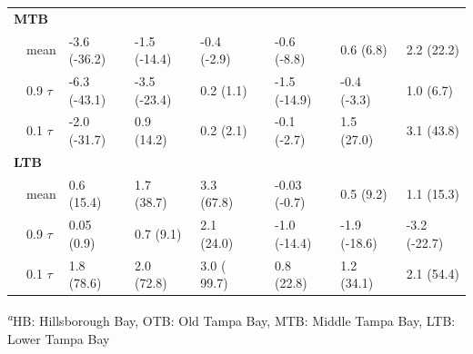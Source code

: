 \documentclass{svjour3}\usepackage[]{graphicx}\usepackage[]{color}
\begin{document}
\begin{table}[!tbp]
\begin{center}
\begin{tabular}{llllclll}
\hline
{\bfseries MTB}&&&&&&&\tabularnewline
~~mean&-3.6 {\footnotesize (-36.2)}&-1.5 {\footnotesize (-14.4)}&-0.4 {\footnotesize (-2.9)}&&-0.6 {\footnotesize (-8.8)}&0.6 {\footnotesize (6.8)}&2.2 {\footnotesize (22.2)}\tabularnewline
~~0.9 $\tau$&-6.3 {\footnotesize (-43.1)}&-3.5 {\footnotesize (-23.4)}&0.2 {\footnotesize (1.1)}&&-1.5 {\footnotesize (-14.9)}&-0.4 {\footnotesize (-3.3)}&1.0 {\footnotesize (6.7)}\tabularnewline
~~0.1 $\tau$&-2.0 {\footnotesize (-31.7)}&0.9 {\footnotesize (14.2)}&0.2 {\footnotesize (2.1)}&&-0.1 {\footnotesize (-2.7)}&1.5 {\footnotesize (27.0)}&3.1 {\footnotesize (43.8)}\tabularnewline
\hline
{\bfseries LTB}&&&&&&&\tabularnewline
~~mean&0.6 {\footnotesize (15.4)}&1.7 {\footnotesize (38.7)}&3.3 {\footnotesize (67.8)}&&-0.03 {\footnotesize (-0.7)}&0.5 {\footnotesize (9.2)}&1.1 {\footnotesize (15.3)}\tabularnewline
~~0.9 $\tau$&0.05 {\footnotesize (0.9)}&0.7 {\footnotesize (9.1)}&2.1 {\footnotesize (24.0)}&&-1.0 {\footnotesize (-14.4)}&-1.9 {\footnotesize (-18.6)}&-3.2 {\footnotesize (-22.7)}\tabularnewline
~~0.1 $\tau$&1.8 {\footnotesize (78.6)}&2.0 {\footnotesize (72.8)}&3.0 {\footnotesize ( 99.7)}&&0.8 {\footnotesize (22.8)}&1.2 {\footnotesize (34.1)}&2.1 {\footnotesize (54.4)}\tabularnewline
\hline
\end{tabular}\end{center}

\footnotesize \textsuperscript{\textit{a}}HB: Hillsborough Bay, OTB: Old Tampa Bay, MTB: Middle Tampa Bay, LTB: Lower Tampa Bay\end{table}
\end{document}
